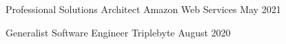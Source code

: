 

\begin{cventries}

  \cventry
    {Professional Solutions Architect} %
    {Amazon Web Services} %
    {} %
    {May 2021} %
    {
      \begin{cvitems}
      \end{cvitems}
    }

\cventry
    {Generalist Software Engineer} %
    {Triplebyte} %
    {} %
    {August 2020} %
    {
      \begin{cvitems}
      \end{cvitems}
    }

\end{cventries}
